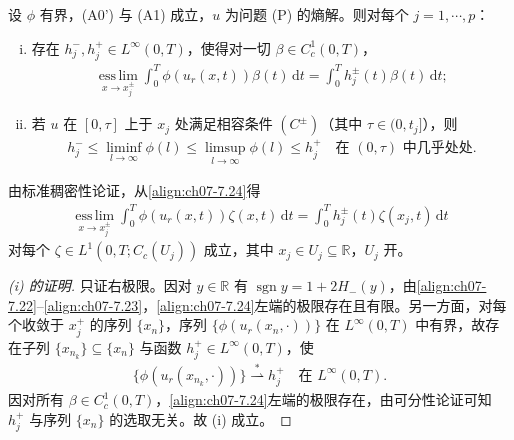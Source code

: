 \documentclass[../../main.tex]{subfiles}%
\begin{document}
\begin{lemma}\label{lemma:ch07-7.2.6}
设 $\phi$ 有界，(A0') 与 (A1) 成立，$u$ 为问题 (P) 的熵解。则对每个 $j=1,\cdots,p$：
\begin{enumerate}[(i)]
\item 存在 $h_j^-,h_j^+\in L^\infty(0,T)$，使得对一切 $\beta\in C^1_c(0,T)$，
\begin{align}
\operatorname*{ess\,lim}_{x\to x_j^\pm}\int_0^T\phi(u_r(x,t))\beta(t)\,\mathrm{d}t
=\int_0^Th_j^\pm(t)\beta(t)\,\mathrm{d}t; \label{align:ch07-7.24}
\end{align}
\item 若 $u$ 在 $[0,\tau]$ 上于 $x_j$ 处满足相容条件 $(C^\pm)$（其中 $\tau\in(0,t_j]$），则
\begin{align}
h_j^-\leqslant\liminf_{l\to\infty}\phi(l)\leqslant\limsup_{l\to\infty}\phi(l)\leqslant h_j^+
\quad\text{在 }(0,\tau)\text{ 中几乎处处}. \label{align:ch07-7.25}
\end{align}
\end{enumerate}
\end{lemma}

\begin{remark}\label{remark:ch07-7.2.3}
由标准稠密性论证，从\eqref{align:ch07-7.24}得
\begin{align}
\operatorname*{ess\,lim}_{x\to x_j^\pm}\int_0^T\phi(u_r(x,t))\zeta(x,t)\,\mathrm{d}t
=\int_0^Th_j^\pm(t)\zeta(x_j,t)\,\mathrm{d}t \label{align:ch07-7.26}
\end{align}
对每个 $\zeta\in L^1(0,T;C_c(U_j))$ 成立，其中 $x_j\in U_j\subseteq\mathbb{R}$，$U_j$ 开。
\end{remark}

\begin{proof}[(i) 的证明]
只证右极限。因对 $y\in\mathbb{R}$ 有 $\operatorname{sgn}y=1+2H_-(y)$，由\eqref{align:ch07-7.22}--\eqref{align:ch07-7.23}，\eqref{align:ch07-7.24}左端的极限存在且有限。另一方面，对每个收敛于 $x_j^+$ 的序列 $\{x_n\}$，序列 $\{\phi(u_r(x_n,\cdot))\}$ 在 $L^\infty(0,T)$ 中有界，故存在子列 $\{x_{n_k}\}\subseteq\{x_n\}$ 与函数 $h_j^+\in L^\infty(0,T)$，使
\begin{align*}
\{\phi(u_r(x_{n_k},\cdot))\}\stackrel{*}{\rightharpoonup}h_j^+\quad\text{在 }L^\infty(0,T).
\end{align*}
因对所有 $\beta\in C^1_c(0,T)$，\eqref{align:ch07-7.24}左端的极限存在，由可分性论证可知 $h_j^+$ 与序列 $\{x_n\}$ 的选取无关。故 (i) 成立。
\end{proof}
\end{document}
